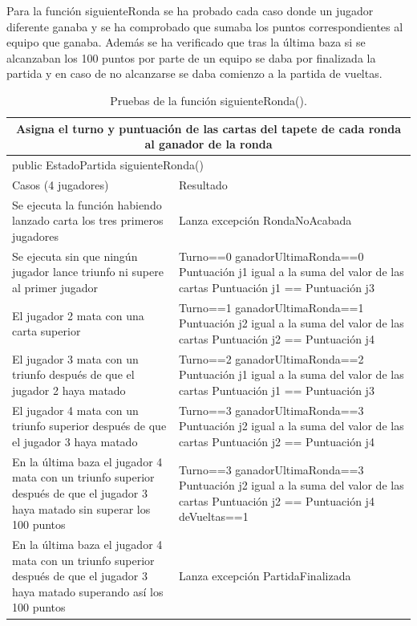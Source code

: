 \begin{center}
\begin{tabular}{ | p{10cm} | p{5cm} |}
    \end{tabular}
    
\end{center}


Para la función siguienteRonda se ha probado cada caso donde un jugador diferente ganaba y se ha comprobado que sumaba los puntos correspondientes al equipo que ganaba. Además se ha verificado que tras la última baza si se alcanzaban los 100 puntos por parte de un equipo se daba por finalizada la partida y en caso de no alcanzarse se daba comienzo a la partida de vueltas.

\begin{table}[htb]
\begin{center}
\begin{tabular}{| p{7cm} | p{7cm} |}
\hline
\multicolumn{2}{|c|}{Asigna el turno y puntuación de las cartas del tapete de cada ronda al ganador de la ronda} \\ \hline
\multicolumn{2}{|l|}{public EstadoPartida siguienteRonda()} \\ \hline
Casos (4 jugadores) & Resultado \\ \hline
   	
Se ejecuta la función habiendo lanzado carta los tres primeros jugadores & Lanza excepción RondaNoAcabada \\ \hline
Se ejecuta sin que ningún jugador lance triunfo ni supere al primer jugador & Turno==0 ganadorUltimaRonda==0 
Puntuación j1 igual a la suma del valor de las cartas 
Puntuación j1 == Puntuación j3 \\ \hline
El jugador 2 mata con una carta superior & Turno==1 ganadorUltimaRonda==1
Puntuación j2 igual a la suma del valor de las cartas
Puntuación j2 == Puntuación j4 \\ \hline
El jugador 3 mata con un triunfo después de que el jugador 2 haya matado & Turno==2 ganadorUltimaRonda==2
Puntuación j1 igual a la suma del valor de las cartas
Puntuación j1 == Puntuación j3 \\ \hline
El jugador 4 mata con un triunfo superior después de que el jugador 3 haya matado & Turno==3 ganadorUltimaRonda==3
Puntuación j2 igual a la suma del valor de las cartas
Puntuación j2 == Puntuación j4 \\ \hline
En la última baza el jugador 4 mata con un triunfo superior después de que el jugador 3 haya matado sin superar los 100 puntos & Turno==3 ganadorUltimaRonda==3
Puntuación j2 igual a la suma del valor de las cartas
Puntuación j2 == Puntuación j4
deVueltas==1 \\ \hline
En la última baza el jugador 4 mata con un triunfo superior después de que el jugador 3 haya matado superando así los 100 puntos & Lanza excepción PartidaFinalizada \\ \hline

 \end{tabular}
 \caption{Pruebas de la función siguienteRonda().}
\label{}
\end{center}
\end{table}


